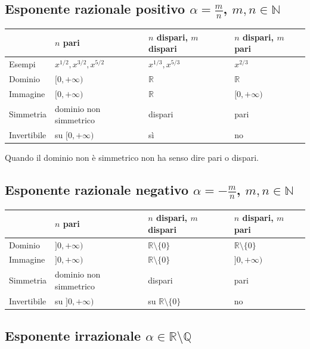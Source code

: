 \documentclass[11pt,a4paper]{article}
\begin{document}
\subsection*{Esponente razionale positivo $\alpha = \frac{m}{n}$, $m, n \in \mathbb{N}$}

\begin{center}
\renewcommand{\arraystretch}{1.3}
\begin{tabular}{@{}llll@{}}
\toprule
 & $n$ pari & $n$ dispari, $m$ dispari & $n$ dispari, $m$ pari \\
\midrule
Esempi & $x^{1/2}, x^{3/2}, x^{5/2}$ & $x^{1/3}, x^{5/3}$ & $x^{2/3}$ \\
Dominio & $[0,+\infty)$ & $\mathbb{R}$ & $\mathbb{R}$ \\
Immagine & $[0,+\infty)$ & $\mathbb{R}$ & $[0,+\infty)$ \\
Simmetria & dominio non simmetrico & dispari & pari \\
Invertibile & su $[0,+\infty)$ & sì & no \\
\bottomrule
\end{tabular}
\end{center}
Quando il dominio non è simmetrico non ha senso dire pari o dispari.

\subsection*{Esponente razionale negativo $\alpha = -\frac{m}{n}$, $m, n \in \mathbb{N}$}

\begin{center}
\renewcommand{\arraystretch}{1.3}
\begin{tabular}{@{}llll@{}}
\toprule
 & $n$ pari & $n$ dispari, $m$ dispari & $n$ dispari, $m$ pari \\
\midrule
Dominio & $]0,+\infty)$ & $\mathbb{R} \setminus \{0\}$ & $\mathbb{R} \setminus \{0\}$ \\
Immagine & $]0,+\infty)$ & $\mathbb{R} \setminus \{0\}$ & $]0,+\infty)$ \\
Simmetria & dominio non simmetrico & dispari & pari \\
Invertibile & su $]0,+\infty)$ & su $\mathbb{R} \setminus \{0\}$ & no \\
\bottomrule
\end{tabular}
\end{center}

\subsection*{Esponente irrazionale $\alpha \in \mathbb{R} \setminus \mathbb{Q}$}
\end{document}
